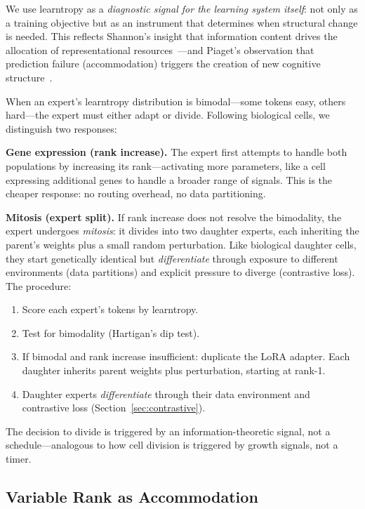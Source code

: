 \documentclass{article}
\begin{document}
We use learntropy as a \emph{diagnostic signal for the learning system itself}: not only as a training objective but as an instrument that determines when structural change is needed. This reflects Shannon's insight that information content drives the allocation of representational resources~\cite{shannon1948}---and Piaget's observation that prediction failure (accommodation) triggers the creation of new cognitive structure~\cite{piaget1952}.

When an expert's learntropy distribution is bimodal---some tokens easy, others hard---the expert must either adapt or divide. Following biological cells, we distinguish two responses:

\textbf{Gene expression (rank increase).} The expert first attempts to handle both populations by increasing its rank---activating more parameters, like a cell expressing additional genes to handle a broader range of signals. This is the cheaper response: no routing overhead, no data partitioning.

\textbf{Mitosis (expert split).} If rank increase does not resolve the bimodality, the expert undergoes \emph{mitosis}: it divides into two daughter experts, each inheriting the parent's weights plus a small random perturbation. Like biological daughter cells, they start genetically identical but \emph{differentiate} through exposure to different environments (data partitions) and explicit pressure to diverge (contrastive loss). The procedure:
\begin{enumerate}
    \item Score each expert's tokens by learntropy.
    \item Test for bimodality (Hartigan's dip test).
    \item If bimodal and rank increase insufficient: duplicate the LoRA adapter.
          Each daughter inherits parent weights plus perturbation, starting at rank-1.
    \item Daughter experts \emph{differentiate} through their data environment and contrastive loss (Section~\ref{sec:contrastive}).
\end{enumerate}
The decision to divide is triggered by an information-theoretic signal, not a schedule---analogous to how cell division is triggered by growth signals, not a timer.

\subsection{Variable Rank as Accommodation}
\end{document}
